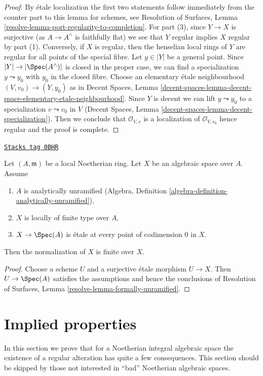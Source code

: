 \begin{proof}
By \'etale localization the first two statements follow
immediately from the counter part to this lemma for schemes, see
Resolution of Surfaces, Lemma \ref{resolve-lemma-port-regularity-to-completion}.
For part (3), since $Y \to X$ is surjective (as $A \to A^\wedge$
is faithfully flat) we see that $Y$ regular implies $X$ regular
by part (1). Conversely, if $X$ is regular, then the henselian
local rings of $Y$ are regular for all points of the special fibre.
Let $y \in |Y|$ be a general point.
Since $|Y| \to |\Spec(A^\wedge)|$ is closed in the proper
case, we can find a specialization $y \leadsto y_0$ with
$y_0$ in the closed fibre. Choose an elementary \'etale
neighbourhood $(V, v_0) \to (Y, y_0)$ as in
Decent Spaces, Lemma
\ref{decent-spaces-lemma-decent-space-elementary-etale-neighbourhood}.
Since $Y$ is decent we can lift $y \leadsto y_0$ to a specialization
$v \leadsto v_0$ in $V$
(Decent Spaces, Lemma \ref{decent-spaces-lemma-decent-specialization}).
Then we conclude that
$\mathcal{O}_{V, v}$ is a localization of $\mathcal{O}_{V, v_0}$
hence regular and the proof is complete.
\end{proof}

\begin{lemma}
\label{spaces-resolve-lemma-formally-unramified}
\href{https://stacks.math.columbia.edu/tag/0BHR}{\texttt{Stacks tag 0BHR}}

Let $(A, \mathfrak m)$ be a local Noetherian ring. Let
$X$ be an algebraic space over $A$. Assume
\begin{enumerate}
\item $A$ is analytically unramified
(Algebra, Definition \ref{algebra-definition-analytically-unramified}),
\item $X$ is locally of finite type over $A$,
\item $X \to \Spec(A)$ is \'etale at every point of codimension $0$ in $X$.
\end{enumerate}
Then the normalization of $X$ is finite over $X$.
\end{lemma}

\begin{proof}
Choose a scheme $U$ and a surjective \'etale morphism $U \to X$.
Then $U \to \Spec(A)$ satisfies the assumptions and hence the
conclusions of
Resolution of Surfaces, Lemma \ref{resolve-lemma-formally-unramified}.
\end{proof}

\section{Implied properties}
\label{spaces-resolve-section-existence-gives}
In this section we prove that for a Noetherian integral algebraic space
the existence of a regular alteration has quite a few consequences.
This section should be skipped by those not interested in ``bad''
Noetherian algebraic spaces.

